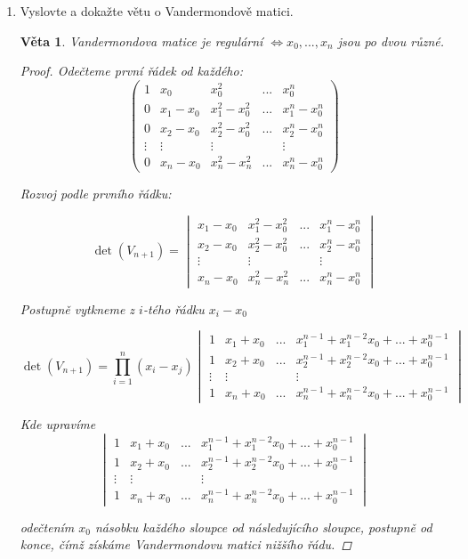 \documentclass[10pt,a4paper]{article}
\theoremstyle{plain}
\newtheorem{veta}{Věta}
\theoremstyle{definition}
\begin{document}
\begin{enumerate}
\item Vyslovte a dokažte větu o Vandermondově matici.
\begin{veta}
Vandermondova matice je regulární $\iff x_0, ..., x_n$ jsou po dvou různé. 
\begin{proof}
Odečteme první řádek od každého:
\[ \begin{pmatrix}
1 & x_0 & x_0^2 & ... & x_0^n \\
0 & x_1 - x_0 & x_1^2 - x_0^2 & ... & x_1^n - x_0^n \\ 
0 & x_2 - x_0 & x_2^2 - x_0^2 & ... & x_2^n - x_0^n \\ 
\vdots & \vdots & \vdots & & \vdots \\
0 & x_n - x_0 & x_n^2 - x_n^2 & ... & x_n^n - x_0^n 
\end{pmatrix}\]

Rozvoj podle prvního řádku:

\[ \det(V_{n+1}) = \begin{vmatrix}
 x_1 - x_0 & x_1^2 - x_0^2 & ... & x_1^n - x_0^n \\ 
 x_2 - x_0 & x_2^2 - x_0^2 & ... & x_2^n - x_0^n \\ 
\vdots & \vdots &  & \vdots \\
 x_n - x_0 & x_n^2 - x_n^2 & ... & x_n^n - x_0^n 
\end{vmatrix}\]

Postupně vytkneme z $i$-tého řádku $x_i - x_0$

\[ \det(V_{n+1}) = \prod^n_{i=1} (x_i - x_j) \begin{vmatrix}
 1 & x_1 +  x_0  & ... &  x_1^{n-1} + x_1^{n-2}x_0 + ... + x_0^{n-1}  \\ 
 1 & x_2 + x_0 & ... &  x_2^{n-1} + x_2^{n-2}x_0 + ... + x_0^{n-1}  \\ 
\vdots & \vdots &  &\vdots \\
 1 & x_n + x_0 & ... & x_n^{n-1} + x_n^{n-2}x_0 + ... + x_0^{n-1} 
\end{vmatrix}\]

Kde upravíme \[  \begin{vmatrix}
 1 & x_1 +  x_0  & ... &  x_1^{n-1} + x_1^{n-2}x_0 + ... + x_0^{n-1}  \\ 
 1 & x_2 + x_0 & ... &  x_2^{n-1} + x_2^{n-2}x_0 + ... + x_0^{n-1}  \\ 
\vdots & \vdots &  &\vdots \\
 1 & x_n + x_0 & ... & x_n^{n-1} + x_n^{n-2}x_0 + ... + x_0^{n-1} 
\end{vmatrix} \]

odečtením $x_0$ násobku každého sloupce od následujícího sloupce, postupně od konce, čímž získáme Vandermondovu matici nižšího řádu.


\end{proof}
\end{veta}
\end{enumerate}
\end{document}
